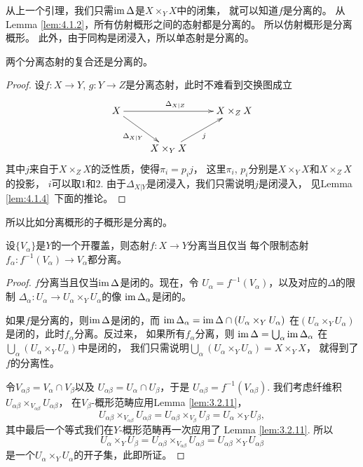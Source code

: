 从上一个引理，我们只需$\operatorname{im} \Delta$是$X\times_Y X$中的闭集，
就可以知道$f$是分离的。
从Lemma \ref{lem:4.1.2}，所有仿射概形之间的态射都是分离的。
所以仿射概形是分离概形。
此外，由于同构是闭浸入，所以单态射是分离的。

\begin{pro}
两个分离态射的复合还是分离的。
\end{pro}

\begin{proof}
设$f:X\to Y$, $g:Y\to Z$是分离态射，此时不难看到交换图成立
\[
\begin{xy}
\xymatrix{
	X \ar[rr]^{\Delta_{X|Z}}\ar[dr]_{\Delta_{X|Y}}&&X\times_Z X\\
	&X\times_Y X \ar[ur]_j&
	}
\end{xy}
\]
其中$j$来自于$X\times_Z X$的泛性质，使得$\pi_i=p_ij$，
这里$\pi_i$, $p_i$分别是$X\times_Y X$和$X\times_Z X$的投影，
$i$可以取$1$和$2$. 由于$\Delta_{X|Y}$是闭浸入，我们只需说明$j$是闭浸入，
见Lemma \ref{lem:4.1.4}~下面的推论。
\end{proof}

所以比如分离概形的子概形是分离的。

\begin{pro}
	设$\{V_\alpha\}$是$Y$的一个开覆盖，则态射$f:X\to Y$分离当且仅当
	每个限制态射$f_\alpha:f^{-1}(V_\alpha)\to V_\alpha$都分离。
\end{pro}

\begin{proof}
	$f$分离当且仅当$\operatorname{im} \Delta$是闭的。现在，令
	$U_\alpha=f^{-1}(V_\alpha)$，以及对应的$\Delta$的限制
	$\Delta_\alpha:U_\alpha\to U_\alpha\times_Y U_\alpha$的像
	$\operatorname{im} \Delta_\alpha$是闭的。

	如果$f$是分离的，则$\operatorname{im} \Delta$是闭的，而
	$\operatorname{im} \Delta_{\alpha}=\operatorname{im} \Delta \cap (U_\alpha\times_Y U_\alpha)$
	在$(U_\alpha\times_Y U_\alpha)$是闭的，此时$f_\alpha$分离。反过来，
	如果所有$f_\alpha$分离，则
	$
	\operatorname{im} \Delta=\bigcup_\alpha \operatorname{im} \Delta_{\alpha}
	$
	在$\bigcup_\alpha (U_\alpha\times_Y U_\alpha)$中是闭的，
	我们只需说明$\bigcup_\alpha (U_\alpha\times_Y U_\alpha)=X\times_Y X$，
	就得到了$f$的分离性。

	令$V_{\alpha\beta}=V_\alpha\cap V_\beta$以及
	$U_{\alpha\beta}=U_\alpha\cap U_\beta$，于是
	$U_{\alpha\beta}=f^{-1}(V_{\alpha\beta})$. 我们考虑纤维积
	$U_{\alpha\beta}\times_{V_{\alpha\beta}}U_{\alpha\beta}$，
	在$V_\beta$-概形范畴应用Lemma \ref{lem:3.2.11}，
	\[
	U_{\alpha\beta}\times_{V_{\alpha\beta}}U_{\alpha\beta}=
	U_{\alpha\beta}\times_{V_\beta} U_\beta=U_{\alpha}\times_{Y} U_\beta,
	\]
	其中最后一个等式我们在$Y$-概形范畴再一次应用了
	Lemma \ref{lem:3.2.11}. 所以
	\[
	U_\alpha\times_Y U_\beta=U_{\alpha\beta}\times_{V_{\alpha\beta}}
	U_{\alpha\beta}=U_{\alpha\beta}\times_{Y}U_{\alpha\beta}
	\]
	是一个$U_\alpha\times_Y U_\alpha$的开子集，此即所证。
\end{proof}

